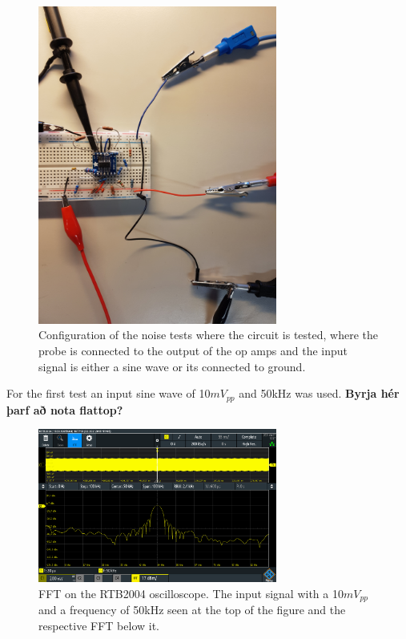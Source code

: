 \begin{figure}[h]
    \centering
    \includegraphics[width=0.7\textwidth]{graphics/TESTINGwSineinp.jpg}
    \caption{Configuration of the noise tests where the circuit is tested, where the probe is connected to the output of the op amps and the input signal is either a sine wave or its connected to ground.}
    \label{fig:SetupFFT}
\end{figure}

For the first test an input sine wave of 10$mV_{pp}$ and 50kHz was used.
\textbf{Byrja hér þarf að nota flattop?}

\begin{figure}[h]
    \centering
    \includegraphics[width=0.7\textwidth]{graphics/FFTRas50kAC1x1.PNG}
    \caption{FFT on the RTB2004 oscilloscope. 
    The input signal with a 10$mV_{pp}$ and a frequency of 50kHz seen at the top of the figure and the respective FFT below it.}
    \label{fig:FFTRas50}
\end{figure}

